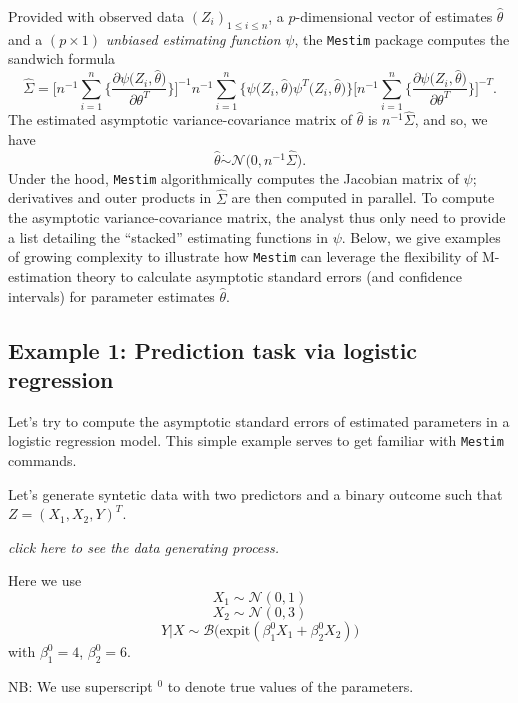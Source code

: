 \documentclass[
]{article}
\begin{document}
Provided with observed data \((Z_i)_{1≤i≤n}\), a \(p\)-dimensional
vector of estimates \(\hat{\theta}\) and a \((p\times 1)\)
\emph{unbiased estimating function} \(\psi\), the \texttt{Mestim}
package computes the sandwich formula
\[\hat{\Sigma}=\Bigg[n^{-1}\sum_{i=1}^n\bigg\{\frac{\partial \psi\big(Z_i,\hat{\theta}\big) }{\partial\theta^T}\bigg\}\Bigg]^{-1}
n^{-1}\sum_{i=1}^n\Big\{ \psi\big(Z_i,\hat{\theta}\big) \psi^T\big(Z_i,\hat{\theta}\big)\Big\}
\Bigg[n^{-1}\sum_{i=1}^n\bigg\{\frac{\partial \psi\big(Z_i,\hat{\theta}\big) }{\partial\theta^T}\bigg\}\Bigg]^{-T}.\]
The estimated asymptotic variance-covariance matrix of \(\hat{\theta}\)
is \(n^{-1} \hat{\Sigma}\), and so, we have
\[\hat{\theta} \mathrel{\dot\sim} \mathcal{N}\big(0, n^{-1} \hat{\Sigma}).\]
Under the hood, \texttt{Mestim} algorithmically computes the Jacobian
matrix of \(\psi\); derivatives and outer products in \(\hat{\Sigma}\)
are then computed in parallel. To compute the asymptotic
variance-covariance matrix, the analyst thus only need to provide a list
detailing the ``stacked'' estimating functions in \(\psi\). Below, we
give examples of growing complexity to illustrate how \texttt{Mestim}
can leverage the flexibility of M-estimation theory to calculate
asymptotic standard errors (and confidence intervals) for parameter
estimates \(\hat{\theta}\).

\hypertarget{example-1-prediction-task-via-logistic-regression}{%
\subsection{Example 1: Prediction task via logistic
regression}\label{example-1-prediction-task-via-logistic-regression}}

Let's try to compute the asymptotic standard errors of estimated
parameters in a logistic regression model. This simple example serves to
get familiar with \texttt{Mestim} commands.

Let's generate syntetic data with two predictors and a binary outcome
such that \(Z=(X_1,X_2,Y)^T\).

\emph{click here to see the data generating process.}

Here we use \[X_1 \sim \mathcal{N}(0,1)\] \[X_2 \sim \mathcal{N}(0,3)\]
\[Y|X \sim \mathcal{B}\Big(\text{expit}(\beta_1^{0}X_1+\beta_2^{0}X_2)\Big)\]
with \(\beta_1^{0}=4\), \(\beta_2^{0}=6\).

NB: We use superscript \(^{0}\) to denote true values of the parameters.
\end{document}

